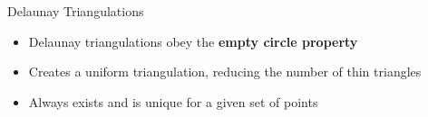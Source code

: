 \begin{frame}{Delaunay Triangulations}
	\begin{itemize}
		\item Delaunay triangulations obey the \textbf{empty circle property}
		\item Creates a uniform triangulation, reducing the number of thin triangles
		\item Always exists and is unique for a given set of points
	\end{itemize}
\end{frame}
